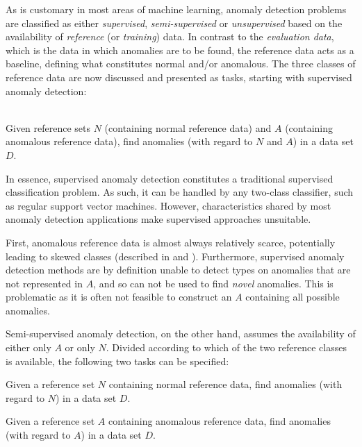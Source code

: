 As is customary in most areas of machine learning, anomaly detection problems are classified as either \emph{supervised}, \emph{semi-supervised} or \emph{unsupervised} based on the availability of \emph{reference} (or \emph{training}) data. In contrast to the \emph{evaluation data}, which is the data in which anomalies are to be found, the reference data acts as a baseline, defining what constitutes normal and/or anomalous. The three classes of reference data are now discussed and presented as tasks, starting with supervised anomaly detection:

\begin{task}
    \label{task:supervised}\ \\
    Given reference sets $N$ (containing normal reference data) and $A$ (containing anomalous reference data), find anomalies (with regard to $N$ and $A$) in a data set $D$.
\end{task}
In essence, supervised anomaly detection constitutes a traditional supervised classification problem. As such, it can be handled by any two-class classifier, such as regular support vector machines. However, characteristics shared by most anomaly detection applications make supervised approaches unsuitable. 

First, anomalous reference data is almost always relatively scarce, potentially leading to skewed classes (described in \cite{phua} and \cite{joshi}). Furthermore, supervised anomaly detection methods are by definition unable to detect types on anomalies that are not represented in $A$, and so can not be used to find \emph{novel} anomalies. This is problematic as it is often not feasible to construct an $A$ containing all possible anomalies.

Semi-supervised anomaly detection, on the other hand, assumes the availability of either only $A$ or only $N$. Divided according to which of the two reference classes is available, the following two tasks can be specified:
\begin{task}
  Given a reference set $N$ containing normal reference data, find anomalies (with regard to $N$) in a data set $D$.
\end{task}
\begin{task}
  \label{task:semisupervised_anomaly_detection}
  Given a reference set $A$ containing anomalous reference data, find anomalies (with regard to $A$) in a data set $D$.
\end{task}

